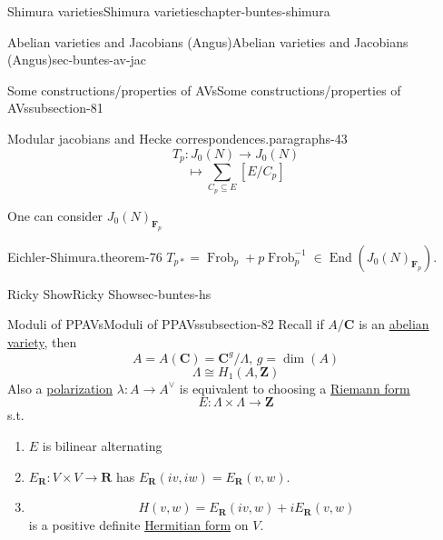 \documentclass[oneside,10pt,]{book}
\numberwithin{equation}{section}
\newcommand{\inv}{^{-1}}
\newcommand{\ZZ}{\mathbf{Z}}
\newcommand{\RR}{\mathbf{R}}
\newcommand{\CC}{\mathbf{C}}
\newcommand{\FF}{\mathbf{F}}
\DeclareMathOperator{\End}{End}
\DeclareMathOperator{\Frob}{Frob}
\begin{document}
\begin{chapterptx}{Shimura varieties}{}{Shimura varieties}{}{}{chapter-buntes-shimura}
\begin{sectionptx}{Abelian varieties and Jacobians (Angus)}{}{Abelian varieties and Jacobians (Angus)}{}{}{sec-buntes-av-jac}
\begin{subsectionptx}{Some constructions/properties of AVs}{}{Some constructions/properties of AVs}{}{}{subsection-81}
\begin{paragraphs}{Modular jacobians and Hecke correspondences.}{paragraphs-43}
\begin{equation*}
T_p \colon J_0(N) \to J_0(N)
\end{equation*}
%
\begin{equation*}
[E] \mapsto \sum_{C_p \subseteq E} [E/C_p]
\end{equation*}
%
\par
\hypertarget{p-1122}{}%
One can consider \(J_0(N)_{\FF_p}\)%
\begin{theorem}{Eichler-Shimura.}{}{theorem-76}%
\hypertarget{p-1123}{}%
\(T_{p*} = \Frob_p + p \Frob_p\inv \in \End(J_0(N)_{\FF_p})\).%
\end{theorem}
\end{paragraphs}%
\end{subsectionptx}
\end{sectionptx}
%
%
\typeout{************************************************}
\typeout{************************************************}
%
\begin{sectionptx}{Ricky Show}{}{Ricky Show}{}{}{sec-buntes-hs}
%
%
\typeout{************************************************}
\typeout{************************************************}
%
\begin{subsectionptx}{Moduli of PPAVs}{}{Moduli of PPAVs}{}{}{subsection-82}
\hypertarget{p-1124}{}%
Recall if \(A/ \CC\) is an \hyperref[def-buntes-abvar]{abelian variety},  then%
\begin{equation*}
A = A(\CC) =  \CC^g/ \Lambda, \,g = \dim (A)
\end{equation*}
%
\begin{equation*}
\Lambda \cong H_1(A,\ZZ)
\end{equation*}
Also a \hyperref[def-c-pol]{polarization} \(\lambda \colon A \to A^\vee\) is equivalent to choosing a \hyperref[def-riemann-form]{Riemann form}%
\begin{equation*}
E \colon \Lambda \times \Lambda \to \ZZ
\end{equation*}
s.t.\leavevmode%
\begin{enumerate}
\item\hypertarget{li-283}{}\(E\) is bilinear alternating%
\item\hypertarget{li-284}{}\(E_\RR \colon V\times V \to \RR\) has \(E_\RR(iv,iw)  = E_\RR( v,w)\).%
\item\hypertarget{li-285}{}%
\begin{equation*}
H(v,w) = E_\RR(iv, w) + i E_\RR(v,w)
\end{equation*}
is a positive definite \hyperref[def-herm-form]{Hermitian form} on \(V\).%

\end{enumerate}
\end{subsectionptx}
\end{sectionptx}
\end{chapterptx}
\end{document}
